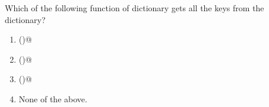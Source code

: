 \question
Which of the following function of dictionary gets all the keys from the dictionary?

\begin{enumerate}
\item \lstinline@getkeys()@
\item \lstinline@key()@
\item \lstinline@keys()@
\item None of the above.
\end{enumerate}

